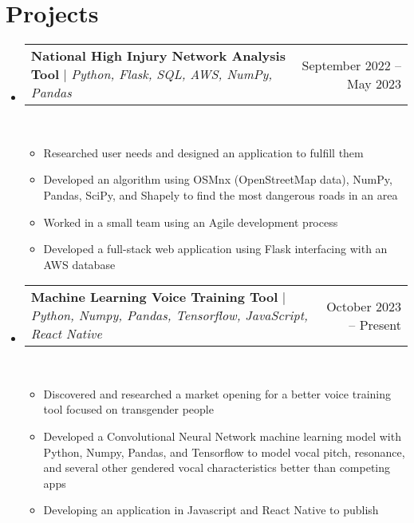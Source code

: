 \documentclass[letterpaper,10pt]{article}
\makeatletter
\newcommand{\resumeItem}[1]{
  \item\small{
    {#1\vspace{-2pt}}
  }
}
\newcommand{\resumeProjectHeading}[2]{
    \item
    \begin{tabular*}{0.97\textwidth}{l@{\extracolsep{\fill}}r}
      \small#1 & #2 \\
    \end{tabular*}\vspace{-7pt}
}
\newcommand{\resumeSubHeadingListStart}{\begin{itemize}[leftmargin=0.15in, label={}]}
\newcommand{\resumeSubHeadingListEnd}{\end{itemize}}
\newcommand{\resumeItemListStart}{\begin{itemize}}
\newcommand{\resumeItemListEnd}{\end{itemize}\vspace{-5pt}}
\makeatother
\begin{document}
\section{Projects}
    \resumeSubHeadingListStart
      \resumeProjectHeading
          {\textbf{National High Injury Network Analysis Tool} $|$ \emph{Python, Flask, SQL, AWS, NumPy, Pandas}}{September 2022 -- May 2023}\\
          \resumeItemListStart
            \resumeItem{Researched user needs and designed an application to fulfill them}
            \resumeItem{Developed an algorithm using OSMnx (OpenStreetMap data), NumPy, Pandas, SciPy, and Shapely to find the most dangerous roads in an area}
            \resumeItem{Worked in a small team using an Agile development process}
            \resumeItem{Developed a full-stack web application using Flask interfacing with an AWS database}
          \resumeItemListEnd
      \resumeProjectHeading
          {\textbf{Machine Learning Voice Training Tool} $|$ \emph{Python, Numpy, Pandas, Tensorflow, JavaScript, React Native}}{October 2023 -- Present}\\
          \resumeItemListStart
            \resumeItem{Discovered and researched a market opening for a better voice training tool focused on transgender people}
            \resumeItem{Developed a Convolutional Neural Network machine learning model with Python, Numpy, Pandas, and Tensorflow to model vocal pitch, resonance, and several other gendered vocal characteristics better than competing apps}
            \resumeItem{Developing an application in Javascript and React Native to publish}
          \resumeItemListEnd


    \resumeSubHeadingListEnd
\end{document}
